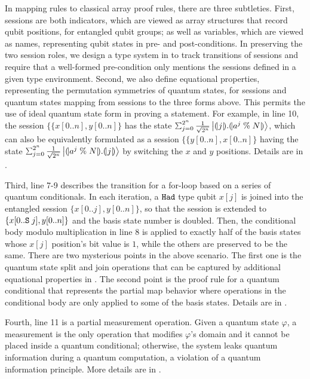 In mapping \qafny rules to classical array proof rules, there are three subtleties. First, sessions are both indicators, which are viewed as array structures that record qubit positions, for entangled qubit groups; as well as variables, which are viewed as names, representing qubit states in pre- and post-conditions.
In preserving the two session roles, we design a type system in  
to track transitions of sessions and require that 
a well-formed pre-condition only mentions the sessions defined in a given type environment.
Second, we also define equational properties, representing the permutation symmetries of quantum states, for 
sessions and quantum states mapping from sessions to the three forms above.
This permits the use of ideal quantum state form in proving a statement.
For example, in  line 10, the session $\{\{x[0..n],y[0..n]\}$ has the state $\sch{2^{n}}{\frac{1}{\sqrt{2^{n}}}}{\tos{j}.\tos{a^{j}\;\%\;N}}$, which can also be equivalently formulated as a session $\{\{y[0..n],x[0..n]\}$ having the state 
$\sch{2^{n}}{\frac{1}{\sqrt{2^{n}}}}{\tos{a^{j}\;\%\;N}.\tos{j}}$ by switching the $x$ and $y$ positions. Details are in .

Third, line 7-9 describes the transition for a for-loop based on a series of quantum conditionals.
In each iteration, a $\texttt{Had}$ type qubit $x[j]$ is joined into the entangled session $\{x[0..j],y[0..n]\}$, 
so that the session is extended to $\{x[0..\texttt{S}\;j],y[0..n]\}$ and the basis state number is doubled.
Then, the conditional body modulo multiplication in line 8 is applied to exactly half of the basis states whose $x[j]$ position's bit value is $1$, while the others are preserved to be the same.
There are two mysterious points in the above scenario.
The first one is the quantum state split and join operations that can be captured by additional equational properties in .
The second point is the proof rule for a quantum conditional that represents the partial map behavior where operations in the conditional body are only applied to some of the basis states. Details are in .

Fourth, line 11 is a partial measurement operation. Given a quantum state $\varphi$, a measurement is the only operation that modifies $\varphi$'s domain and it cannot be placed inside a quantum conditional; otherwise, the system leaks quantum information during a quantum computation, a violation of a quantum information principle. More details are in .
